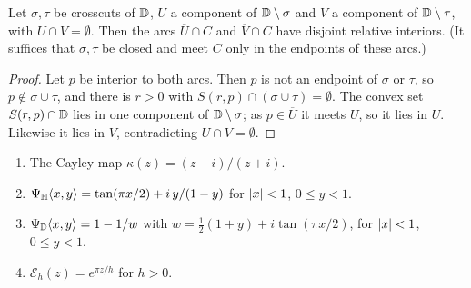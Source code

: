 \begin{lemma}\label{lem:disjoint-arcs}
Let $\sigma,\tau$ be crosscuts of $\mathbb{D}$, $U$ a component of $\mathbb{D}\setminus\sigma$ and $V$ a component of
$\mathbb{D}\setminus\tau$, with $U\cap V=\emptyset$. Then the arcs $\overline U\cap C$ and $\overline V\cap C$ have
disjoint relative interiors. (It suffices that $\sigma,\tau$ be closed and meet $C$ only in the endpoints of these
arcs.)
\end{lemma}
\begin{proof}
Let $p$ be interior to both arcs. Then $p$ is not an endpoint of $\sigma$ or $\tau$, so $p\notin\sigma\cup\tau$,
and there is $r>0$ with $S(r,p)\cap(\sigma\cup\tau)=\emptyset$. The convex set $S(r,p)\cap\mathbb{D}$ lies in one
component of $\mathbb{D}\setminus\sigma$; as $p\in\overline U$ it meets $U$, so it lies in $U$. Likewise it lies in
$V$, contradicting $U\cap V=\emptyset$.
\end{proof}

\begin{definition}[charts]\label{def:charts}
\begin{enumerate}[label=(\alph*)]
\item The Cayley map $\kappa(z)=(z-i)/(z+i)$.
\item $\Psi_{\mathbb{H}}\langle x,y\rangle=\tan(\pi x/2)+i\,y/(1-y)$ for $\lvert x\rvert<1$, $0\le y<1$.
\item $\Psi_{\mathbb{D}}\langle x,y\rangle=1-1/w$ with $w=\tfrac12(1+y)+i\tan(\pi x/2)$, for $\lvert x\rvert<1$, $0\le y<1$.
\item $\mathcal E_h(z)=e^{\pi z/h}$ for $h>0$.
\end{enumerate}
\end{definition}

